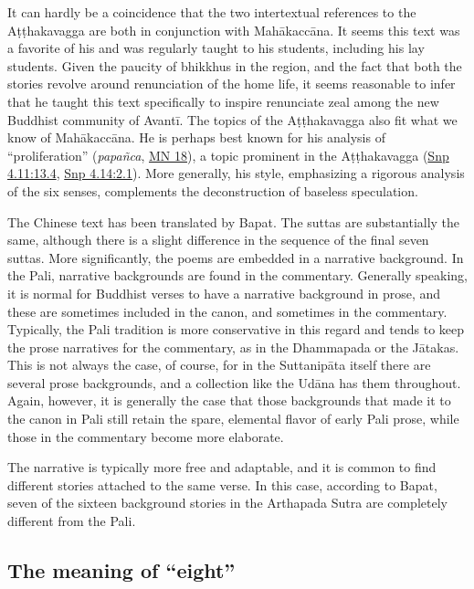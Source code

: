 \documentclass[12pt,openany]{book}%
\begin{document}
It can hardly be a coincidence that the two intertextual references to the \textsanskrit{Aṭṭhakavagga} are both in conjunction with \textsanskrit{Mahākaccāna}. It seems this text was a favorite of his and was regularly taught to his students, including his lay students. Given the paucity of bhikkhus in the region, and the fact that both the stories revolve around renunciation of the home life, it seems reasonable to infer that he taught this text specifically to inspire renunciate zeal among the new Buddhist community of \textsanskrit{Avantī}. The topics of the \textsanskrit{Aṭṭhakavagga} also fit what we know of \textsanskrit{Mahākaccāna}. He is perhaps best known for his analysis of “proliferation” (\textit{\textsanskrit{papañca}}, \href{https://suttacentral.net/mn18/en/sujato}{MN 18}), a topic prominent in the \textsanskrit{Aṭṭhakavagga} (\href{https://suttacentral.net/snp4.11/en/sujato\#13.4}{Snp 4.11:13.4}, \href{https://suttacentral.net/snp4.14/en/sujato\#2.1}{Snp 4.14:2.1}). More generally, his style, emphasizing a rigorous analysis of the six senses, complements the deconstruction of baseless speculation.

The Chinese text has been translated by Bapat. The suttas are substantially the same, although there is a slight difference in the sequence of the final seven suttas. More significantly, the poems are embedded in a narrative background. In the Pali, narrative backgrounds are found in the commentary. Generally speaking, it is normal for Buddhist verses to have a narrative background in prose, and these are sometimes included in the canon, and sometimes in the commentary. Typically, the Pali tradition is more conservative in this regard and tends to keep the prose narratives for the commentary, as in the Dhammapada or the \textsanskrit{Jātakas}. This is not always the case, of course, for in the \textsanskrit{Suttanipāta} itself there are several prose backgrounds, and a collection like the \textsanskrit{Udāna} has them throughout. Again, however, it is generally the case that those backgrounds that made it to the canon in Pali still retain the spare, elemental flavor of early Pali prose, while those in the commentary become more elaborate.

The narrative is typically more free and adaptable, and it is common to find different stories attached to the same verse. In this case, according to Bapat, seven of the sixteen background stories in the Arthapada Sutra are completely different from the Pali.

\subsection*{The meaning of “eight”}
\end{document}
